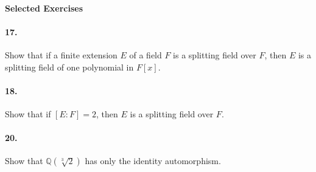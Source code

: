 \documentclass[10pt,a4paper]{article}
\begin{document}
\paragraph{Selected Exercises}

\paragraph{17.} Show that if a finite extension $E$ of a field $F$ is a splitting field over $F$, then $E$ is a splitting field of one polynomial in $F[x]$.

\paragraph{18.} Show that if $[E:F]=2$, then $E$ is a splitting field over $F$.

\paragraph{20.} Show that $\mathbb{Q}(\sqrt[3]{2})$ has only the identity automorphism.
\end{document}
